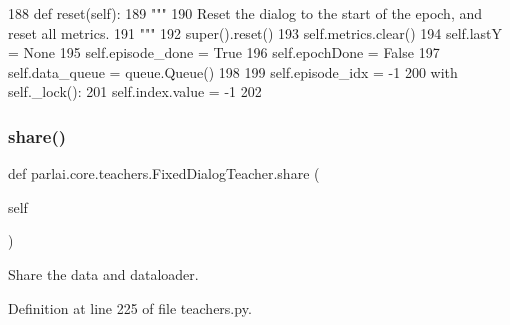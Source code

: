 \begin{DoxyCode}
188     \textcolor{keyword}{def }reset(self):
189         \textcolor{stringliteral}{"""}
190 \textcolor{stringliteral}{        Reset the dialog to the start of the epoch, and reset all metrics.}
191 \textcolor{stringliteral}{        """}
192         super().reset()
193         self.metrics.clear()
194         self.lastY = \textcolor{keywordtype}{None}
195         self.episode\_done = \textcolor{keyword}{True}
196         self.epochDone = \textcolor{keyword}{False}
197         self.data\_queue = queue.Queue()
198 
199         self.episode\_idx = -1
200         with self.\_lock():
201             self.index.value = -1
202 
\end{DoxyCode}
\mbox{\label{classparlai_1_1core_1_1teachers_1_1FixedDialogTeacher_af1501d26676b7cf0ed8f41d51c31e686}} 
\subsubsection{\texorpdfstring{share()}{share()}}
{\footnotesize\ttfamily def parlai.\+core.\+teachers.\+Fixed\+Dialog\+Teacher.\+share (\begin{DoxyParamCaption}\item[{}]{self }\end{DoxyParamCaption})}

\begin{DoxyVerb}Share the data and dataloader.
\end{DoxyVerb}
 

Definition at line 225 of file teachers.\+py.


